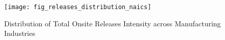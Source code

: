 \begin{figure}[H]
    \centering
    \texttt{[image: fig\_releases\_distribution\_naics]}
    \caption{Distribution of Total Onsite Releases Intensity across Manufacturing Industries}
    \label{fig:releases-distribution-naics}
\end{figure}